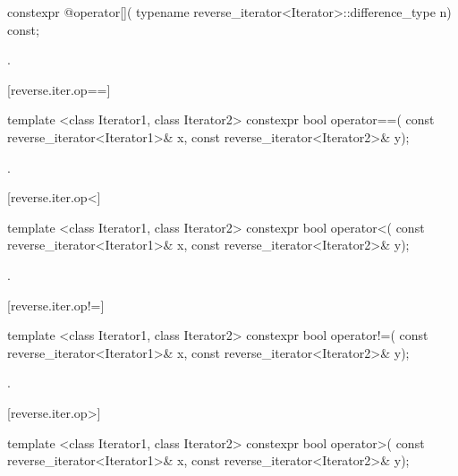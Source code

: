 %
\begin{itemdecl}
constexpr @\unspec@ operator[](
    typename reverse_iterator<Iterator>::difference_type n) const;
\end{itemdecl}

\begin{itemdescr}
\pnum
\returns
{}.
\end{itemdescr}

[reverse.iter.op==]{}

%
\begin{itemdecl}
template <class Iterator1, class Iterator2>
  constexpr bool operator==(
    const reverse_iterator<Iterator1>& x,
    const reverse_iterator<Iterator2>& y);
\end{itemdecl}

\begin{itemdescr}
\pnum
\returns
{}.
\end{itemdescr}

[reverse.iter.op<]{}

%
\begin{itemdecl}
template <class Iterator1, class Iterator2>
  constexpr bool operator<(
    const reverse_iterator<Iterator1>& x,
    const reverse_iterator<Iterator2>& y);
\end{itemdecl}

\begin{itemdescr}
\pnum
\returns
{}.
\end{itemdescr}

[reverse.iter.op!=]{}

%
\begin{itemdecl}
template <class Iterator1, class Iterator2>
  constexpr bool operator!=(
    const reverse_iterator<Iterator1>& x,
    const reverse_iterator<Iterator2>& y);
\end{itemdecl}

\begin{itemdescr}
\pnum
\returns
{}.
\end{itemdescr}

[reverse.iter.op>]{}

%
\begin{itemdecl}
template <class Iterator1, class Iterator2>
  constexpr bool operator>(
    const reverse_iterator<Iterator1>& x,
    const reverse_iterator<Iterator2>& y);
\end{itemdecl}


